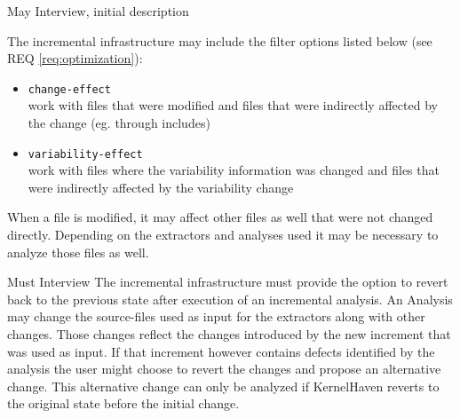 \documentclass[a4paper]{article}
\begin{document}
\begin{req}
\begin{subreq} \label{req:effect-filters}
    \reqtable
	{May}  {Interview, initial description}
	{
	The incremental infrastructure may include the filter options listed below (see REQ \ref{req:optimization}):
	\begin{itemize}
		\item \texttt{change-effect} \\
		work with files that were modified and files that were indirectly affected by the change (eg. through includes)
	    \item \texttt{variability-effect}  \\
	    work with files where the variability information was changed and files that were indirectly affected by the variability change
	\end{itemize}
    }
	{When a file is modified, it may affect other files as well that were not changed directly. Depending on the extractors and analyses used it may be necessary to analyze those files as well.}
\end{subreq}

\end{req}

\begin{req} \label{req:rollback}
\reqtable
	{Must}  {Interview}
	{The incremental infrastructure must provide the option to revert back to the previous state after execution of an incremental analysis.}
	{An Analysis may change the source-files used as input for the extractors along with other changes. Those changes reflect the changes introduced by the new increment that was used as input. If that increment however contains defects identified by the analysis the user might choose to revert the changes and propose an alternative change. This alternative change can only be analyzed if KernelHaven reverts to the original state before the initial change.}

\end{req}
\end{document}
